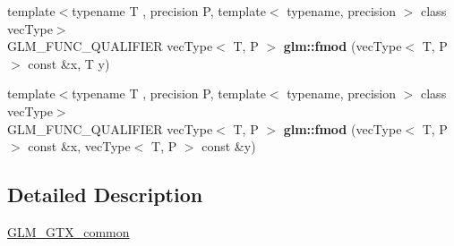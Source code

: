 \begin{DoxyCompactItemize}
\item 
\mbox{\label{common_8inl_a8f5595207b335bcff3fa45a6f4a7767e}} 
{\footnotesize template$<$typename T , precision P, template$<$ typename, precision $>$ class vec\+Type$>$ }\\G\+L\+M\+\_\+\+F\+U\+N\+C\+\_\+\+Q\+U\+A\+L\+I\+F\+I\+ER vec\+Type$<$ T, P $>$ {\bfseries glm\+::fmod} (vec\+Type$<$ T, P $>$ const \&x, T y)
\item 
\mbox{\label{common_8inl_aa23aa36dcfb6be51d71310412fdedfd1}} 
{\footnotesize template$<$typename T , precision P, template$<$ typename, precision $>$ class vec\+Type$>$ }\\G\+L\+M\+\_\+\+F\+U\+N\+C\+\_\+\+Q\+U\+A\+L\+I\+F\+I\+ER vec\+Type$<$ T, P $>$ {\bfseries glm\+::fmod} (vec\+Type$<$ T, P $>$ const \&x, vec\+Type$<$ T, P $>$ const \&y)
\end{DoxyCompactItemize}


\subsection{Detailed Description}
\hyperlink{group__gtx__common}{G\+L\+M\+\_\+\+G\+T\+X\+\_\+common} 